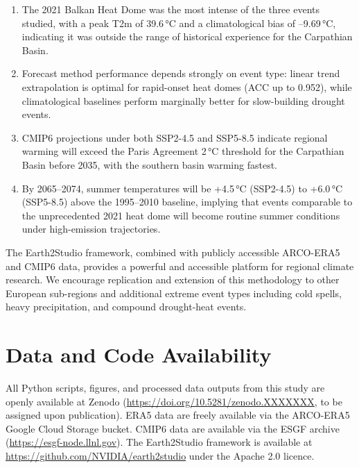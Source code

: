 \documentclass[12pt,a4paper]{article}
\begin{document}
\begin{enumerate}
  \item The 2021 Balkan Heat Dome was the most intense of the three
        events studied, with a peak T2m of 39.6\,°C and a climatological
        bias of --9.69\,°C, indicating it was outside the range of
        historical experience for the Carpathian Basin.

  \item Forecast method performance depends strongly on event type:
        linear trend extrapolation is optimal for rapid-onset heat
        domes (ACC up to 0.952), while climatological baselines
        perform marginally better for slow-building drought events.

  \item CMIP6 projections under both SSP2-4.5 and SSP5-8.5 indicate
        regional warming will exceed the Paris Agreement 2\,°C threshold
        for the Carpathian Basin before 2035, with the southern basin
        warming fastest.

  \item By 2065--2074, summer temperatures will be +4.5\,°C (SSP2-4.5)
        to +6.0\,°C (SSP5-8.5) above the 1995--2010 baseline, implying
        that events comparable to the unprecedented 2021 heat dome will
        become routine summer conditions under high-emission trajectories.
\end{enumerate}

The Earth2Studio framework, combined with publicly accessible ARCO-ERA5
and CMIP6 data, provides a powerful and accessible platform for
regional climate research. We encourage replication and extension of
this methodology to other European sub-regions and additional extreme
event types including cold spells, heavy precipitation, and compound
drought-heat events.

\section*{Data and Code Availability}

All Python scripts, figures, and processed data outputs from this study
are openly available at Zenodo (\url{https://doi.org/10.5281/zenodo.XXXXXXX},
to be assigned upon publication). ERA5 data are freely available via the
ARCO-ERA5 Google Cloud Storage bucket. CMIP6 data are available via the
ESGF archive (\url{https://esgf-node.llnl.gov}). The Earth2Studio
framework is available at \url{https://github.com/NVIDIA/earth2studio}
under the Apache 2.0 licence.
\end{document}
